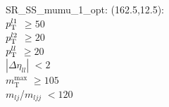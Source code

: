 SR\_SS\_mumu\_1\_opt: (162.5,12.5): \\
$p_{\text{T}}^{l1}$ $\geq 50$ \\
$p_{\text{T}}^{l2}$ $\geq 20$ \\
$p_{\text{T}}^{ll}$ $\geq 20$ \\
$|\Delta\eta_{ll}|$ $<2$ \\
$m_{\text{T}}^{\text{max}}$ $\geq 105$ \\
$m_{lj}$/$m_{ljj}$ $<120$ \\
